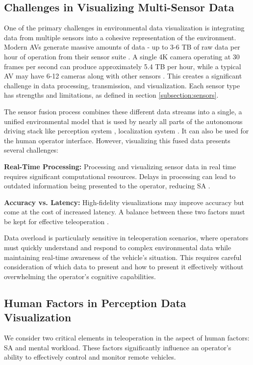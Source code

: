 \subsection{Challenges in Visualizing Multi-Sensor Data}\label{subsection:challengesmultisensor}
One of the primary challenges in environmental data visualization is integrating data from multiple
sensors into a cohesive representation of the environment. Modern \acp{AV} generate
massive amounts of data - up to 3-6 TB of raw data per hour of operation from their sensor suite \cite{kazhamiaka2021challenges}
. A single 4K camera operating at 30 frames per second can produce
approximately 5.4 TB per hour, while a typical AV may have 6-12 cameras along with other sensors \cite{visualcapitalist2024}
. This creates a significant challenge in data processing, transmission,
and visualization. Each sensor type has strengths and limitations, as defined in section \ref{subsection:sensors}.

The sensor fusion process combines these different data streams into a single, a unified environmental
model that is used by nearly all parts of the autonomous driving stack like perception system \cite{feng2020deep}
, localization system \cite{feng2020deep, el-sheimy2020sensorfusion}. It can also be used for the human operator interface.
However, visualizing this fused data presents several challenges:

\textbf{Real-Time Processing:} Processing and visualizing sensor data in real time requires significant computational resources. Delays in processing can lead to outdated information being presented to the operator, reducing \ac{SA} \cite{Gnatzig}.

\textbf{Accuracy vs. Latency:} High-fidelity visualizations may improve accuracy but come at the cost of increased latency. A balance between these two factors must be kept for effective teleoperation \cite{chucholowski2014teleoperated}.

Data overload is particularly sensitive in teleoperation scenarios, where operators must quickly understand and respond to complex environmental data while maintaining real-time awareness of the vehicle's situation. This requires careful consideration of which data to present and how to present it effectively without overwhelming the operator's cognitive capabilities.

\subsection{Human Factors in Perception Data Visualization}\label{subsection:humanfactors}
We consider two critical elements in teleoperation in the aspect of human factors: \ac{SA} and mental workload. These factors significantly influence an operator's ability to effectively control and monitor remote vehicles.


